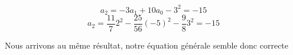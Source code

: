 \documentclass[A4paper,11pt]{article}
\begin{document}
\begin{enumerate}
\begin{enumerate}
        \[
        a_2 = -3a_1 + 10a_0 - 3^2 = -15
        \]
        \[
        a_2 = \frac{11}{7}2^2 - \frac{25}{56}(-5)^2 - \frac{9}{8}3^2 = -15
        \]
        
        Nous arrivons au même résultat, notre équation générale semble donc correcte
    \end{enumerate}
\end{enumerate}

\begin{comment}
Soit l'équation de récurrence linéaire de degré k non-homogène avec terme de source:
\[
a_n = a_{n-1} + a_{n-2} + ... + a_{n-k} + F(n)
\]
\begin{align*}
    &F(n) = \alpha_1n^m + \alpha_2n^{m-1} + ... + \alpha_{m}n + \alpha_{m+1} => a_n = \beta_1n^m + \beta_2n^{m-1} + ... + \beta_{m}n + \beta_{m+1}\\
    &F(n) = s^n \textrm{ et s n'est pas racine} => a_n = cs^n\\
    &F(n) = s^n \textrm{ et s est racine de multiplicité m} => a_n = cn^ms^n\\
    &F(n) = (\alpha_1n^m + \alpha_2n^{m-1} + ... + \alpha_{m}n + \alpha_{m+1})s^n \textrm{ et s n'est pas racine} \\ &=> a_n = (\beta_1n^m + \beta_2n^{m-1} + ... + \beta_{m}n + \beta_{m+1})s^n\\
    &F(n) = (\alpha_1n^m + \alpha_2n^{m-1} + ... + \alpha_{m}n + \alpha_{m+1})s^n \textrm{ et s est racine de multiplicité m} \\ &=> a_n = (\beta_1n^m + \beta_2n^{m-1} + ... + \beta_{m}n + \beta_{m+1})n^ms^n
\end{align*}


\begin{align*}
a_n &= an1^n\\
a_n &= 3a_{n-1} - 2a_{n-2} + 1\\
an1^{n} &= 3a(n-1)1^{n-1} -2a(n-2)1^{n-2} + 1\\
an &= 3an -3a -2an + 4a +1\\
0 &= a + 1\\
a&=-1
\end{align*}

$\exists! xP(x) \equiv \exists x(P(x)\land \forall y (P(y) \Rightarrow x=y))$

$\neg (p\Rightarrow q) \equiv \neg (\neg p \lor q) \equiv p \land \neg q$
\end{comment}
\end{document}
